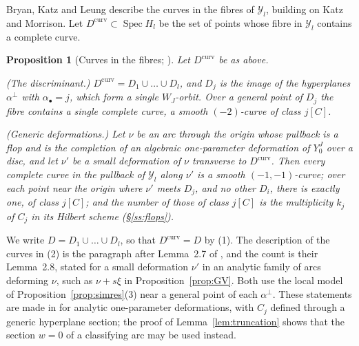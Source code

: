 \documentclass[11pt]{amsart}
\makeatletter
\numberwithin{table}{section}
\numberwithin{figure}{section}
\numberwithin{equation}{section}
\newtheorem{prop}[thm]{Proposition}
\theoremstyle{definition}
\theoremstyle{plain}
\newcommand{\cY}{\mathcal{Y}}
\newcommand{\bul}{\bullet}
\DeclareMathOperator{\Spec}{Spec}
\renewcommand\paragraph{\@startsection{paragraph}{4}{\z@}{\medskipamount}{-.5em}{\normalfont\bfseries}}
\makeatother
\begin{document}
\paragraph{Curves in the fibres.} Bryan, Katz and Leung describe the curves in the fibres of $\cY_l$, building on Katz and Morrison. Let $D^{\mathrm{curv}} \subset \Spec H_l$ be the set of points whose fibre in $\cY_l$ contains a complete curve.

\begin{prop}[{Curves in the fibres; \cite[Prop~2.3, Lemmas~2.4, 2.8]{BKL}}]\label{prop:BKL}
Let $D^{\mathrm{curv}}$ be as above.
\begin{thmlist}
\item (The discriminant.) $D^{\mathrm{curv}} = D_1 \cup \dots \cup D_l$, and $D_j$ is the image of the hyperplanes $\alpha^\perp$ with $\alpha_\bul = j$, which form a single $W_J$-orbit. Over a general point of $D_j$ the fibre contains a single complete curve, a smooth $(-2)$-curve of class $j[C]$.
\item (Generic deformations.) Let $\nu$ be an arc through the origin whose pullback is a flop and is the completion of an algebraic one-parameter deformation of $Y_0^J$ over a disc, and let $\nu'$ be a small deformation of $\nu$ transverse to $D^{\mathrm{curv}}$. Then every complete curve in the pullback of $\cY_l$ along $\nu'$ is a smooth $(-1,-1)$-curve; over each point near the origin where $\nu'$ meets $D_j$, and no other $D_i$, there is exactly one, of class $j[C]$; and the number of those of class $j[C]$ is the multiplicity $k_j$ of $C_j$ in its Hilbert scheme (\S\ref{ss:flops}).
\end{thmlist}
\end{prop}

We write $D = D_1 \cup \dots \cup D_l$, so that $D^{\mathrm{curv}} = D$ by (1). The description of the curves in (2) is the paragraph after Lemma~2.7 of \cite{BKL}, and the count is their Lemma~2.8, stated for a small deformation $\nu'$ in an analytic family of arcs deforming $\nu$, such as $\nu + s\xi$ in Proposition~\ref{prop:GV}. Both use the local model of Proposition~\ref{prop:simres}(3) near a general point of each $\alpha^\perp$. These statements are made in \cite{BKL} for analytic one-parameter deformations, with $C_j$ defined through a generic hyperplane section; the proof of Lemma~\ref{lem:truncation} shows that the section $w = 0$ of a classifying arc may be used instead.
\end{document}
